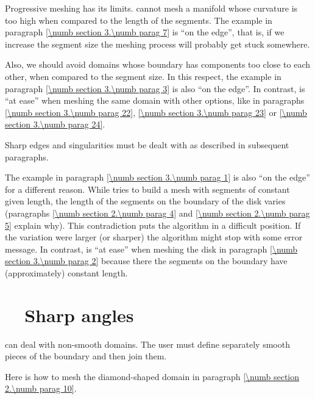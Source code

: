 Progressive meshing has its limits.
{\ManiFEM} cannot mesh a manifold whose curvature is too high when compared to the
length of the segments.
The example in paragraph \ref{\numb section 3.\numb parag 7} is ``on the edge'', that is,
if we increase the segment size the meshing process will probably get stuck somewhere.

Also, we should avoid domains whose boundary has components too close to each other,
when compared to the segment size.
In this respect, the example in paragraph \ref{\numb section 3.\numb parag 3} is also
``on the edge''.
In contrast, {\maniFEM} is ``at ease'' when meshing the same domain with other options,
like in paragraphs \ref{\numb section 3.\numb parag 22}, \ref{\numb section 3.\numb parag 23}
or \ref{\numb section 3.\numb parag 24}.

Sharp edges and singularities must be dealt with as described in subsequent paragraphs.

The example in paragraph \ref{\numb section 3.\numb parag 1} is also ``on the edge''
for a different reason.
While {\maniFEM} tries to build a mesh with segments of constant given length,
the length of the segments on the boundary of the disk varies (paragraphs
\ref{\numb section 2.\numb parag 4} and \ref{\numb section 2.\numb parag 5} explain why).
This contradiction puts the algorithm in a difficult position.
If the variation were larger (or sharper) the algorithm might stop with some error message.
In contrast, {\maniFEM} is ``at ease'' when meshing the disk in paragraph
\ref{\numb section 3.\numb parag 2} because there the segments on the boundary have
(approximately) constant length.


\section{~~Sharp angles}\label{\numb section 3.\numb parag 17}

{\ManiFEM} can deal with non-smooth domains.
The user must define separately smooth pieces of the boundary and then join them.

Here is how to mesh the diamond-shaped domain in paragraph \ref{\numb section 2.\numb parag 10}.

